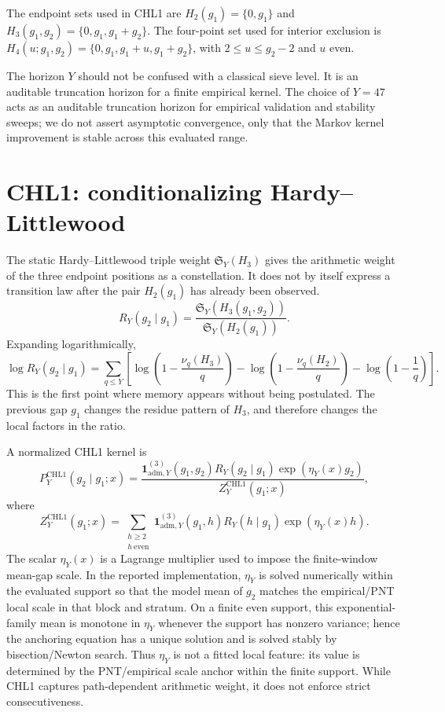 \documentclass[10pt]{article}
\newcommand{\SY}{\mathfrak{S}_Y}
\newcommand{\CHLone}{\mathrm{CHL1}}
\begin{document}
The endpoint sets used in CHL1 are $H_2(g_1)=\{0,g_1\}$ and $H_3(g_1,g_2)=\{0,g_1,g_1+g_2\}$. The four-point set used for interior exclusion is $H_4(u;g_1,g_2)=\{0,g_1,g_1+u,g_1+g_2\}$, with $2\le u\le g_2-2$ and $u$ even.

The horizon $Y$ should not be confused with a classical sieve level. It is an auditable truncation horizon for a finite empirical kernel. The choice of $Y=47$ acts as an auditable truncation horizon for empirical validation and stability sweeps; we do not assert asymptotic convergence, only that the Markov kernel improvement is stable across this evaluated range.
\section{CHL1: conditionalizing Hardy--Littlewood}
The static Hardy--Littlewood triple weight $\SY(H_3)$ gives the arithmetic weight of the three endpoint positions as a constellation. It does not by itself express a transition law after the pair $H_2(g_1)$ has already been observed.
\[
R_Y(g_2\mid g_1)=\frac{\SY(H_3(g_1,g_2))}{\SY(H_2(g_1))}.
\]
Expanding logarithmically,
\[
\log R_Y(g_2\mid g_1)=\sum_{q\le Y}\left[\log\left(1-\frac{\nu_q(H_3)}{q}\right)-\log\left(1-\frac{\nu_q(H_2)}{q}\right)-\log\left(1-\frac{1}{q}\right)\right].
\]
This is the first point where memory appears without being postulated. The previous gap $g_1$ changes the residue pattern of $H_3$, and therefore changes the local factors in the ratio.

A normalized CHL1 kernel is
\[
P_Y^{\CHLone}(g_2\mid g_1;x)=\frac{\mathbf{1}_{\mathrm{adm},Y}^{(3)}(g_1,g_2)R_Y(g_2\mid g_1)\exp(\eta_Y(x)g_2)}{Z_Y^{\CHLone}(g_1;x)},
\]
where
\[
Z_Y^{\CHLone}(g_1;x)=\sum_{\substack{h\ge 2\\h\ \mathrm{even}}}\mathbf{1}_{\mathrm{adm},Y}^{(3)}(g_1,h)R_Y(h\mid g_1)\exp(\eta_Y(x)h).
\]
The scalar $\eta_Y(x)$ is a Lagrange multiplier used to impose the finite-window mean-gap scale. In the reported implementation, $\eta_Y$ is solved numerically within the evaluated support so that the model mean of $g_2$ matches the empirical/PNT local scale in that block and stratum. On a finite even support, this exponential-family mean is monotone in $\eta_Y$ whenever the support has nonzero variance; hence the anchoring equation has a unique solution and is solved stably by bisection/Newton search. Thus $\eta_Y$ is not a fitted local feature: its value is determined by the PNT/empirical scale anchor within the finite support. While CHL1 captures path-dependent arithmetic weight, it does not enforce strict consecutiveness.
\end{document}

